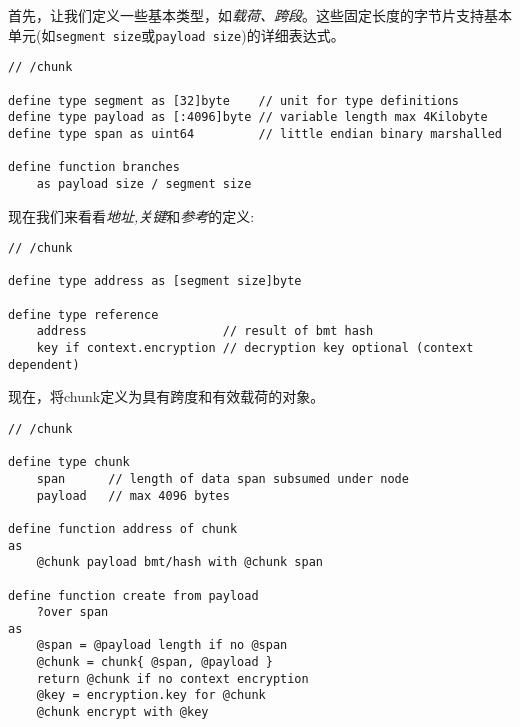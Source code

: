 首先，让我们定义一些基本类型，如\emph{载荷、跨段}。这些固定长度的字节片支持基本单元(如\lstinline{segment size}或\lstinline{payload size})的详细表达式。

\begin{definition}\label{def:chunk-constants}
\begin{lstlisting}[language=buzz1]
// /chunk

define type segment as [32]byte    // unit for type definitions
define type payload as [:4096]byte // variable length max 4Kilobyte
define type span as uint64         // little endian binary marshalled

define function branches 
    as payload size / segment size

\end{lstlisting}
\end{definition}

现在我们来看看\emph{地址,关键}和\emph{参考}的定义:                                             

\begin{definition}\label{def:chunk-reference}
\begin{lstlisting}[language=buzz1]
// /chunk

define type address as [segment size]byte

define type reference 
    address                   // result of bmt hash
    key if context.encryption // decryption key optional (context dependent)

\end{lstlisting}
\end{definition}

现在，将chunk定义为具有跨度和有效载荷的对象。

\begin{definition}\label{def:chunks}
\begin{lstlisting}[language=buzz1]
// /chunk

define type chunk
    span      // length of data span subsumed under node
    payload   // max 4096 bytes 

define function address of chunk
as
    @chunk payload bmt/hash with @chunk span 

define function create from payload
    ?over span
as
    @span = @payload length if no @span
    @chunk = chunk{ @span, @payload }
    return @chunk if no context encryption
    @key = encryption.key for @chunk 
    @chunk encrypt with @key
\end{lstlisting}
\end{definition}

